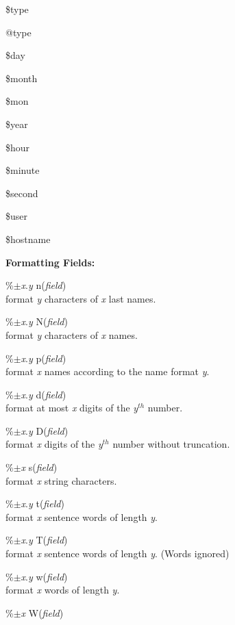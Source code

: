\documentclass[a4paper]{article}
\newenvironment{FlatList}{\begin{list}{}{%
      \topsep=0pt\itemsep=0pt\parsep=0pt\let\makelabel=\flatlistlabel}}{\end{list}}%
\newcommand\flatlistlabel[1]{\descriptionlabel{\textsf{#1}}}
\begin{document}
\begin{multicols}{4}
\begin{FlatList}
  \item [\$type]
  \item [@type]
  \item [\$day]
  \item [\$month]
  \item [\$mon]
  \item [\$year]
  \item [\$hour]
  \item [\$minute]
  \item [\$second]
  \item [\$user]
  \item [\$hostname]
  \end{FlatList}
  \textbf{Formatting Fields:} 
  \begin{FlatList}
  \item [\%$\pm ${\it x}.{\it y}\/ n({\it field}\/)]\ \\
    format {\it y}\/ characters of {\it x}\/ last names.
  \item [\%$\pm ${\it x}.{\it y}\/ N({\it field}\/)]\ \\
    format {\it y}\/ characters of {\it x}\/ names.
  \item [\%$\pm ${\it x}.{\it y}\/ p({\it field}\/)]\ \\
    format {\it x}\/ names according to the name format {\it y}.
  \item [\%$\pm ${\it x}.{\it y}\/ d({\it field}\/)]\ \\
    format at most {\it x}\/ digits of the {\it y}$^{th}$ number.
  \item [\%$\pm ${\it x}.{\it y}\/ D({\it field}\/)]\ \\
    format {\it x}\/ digits of the {\it y}$^{th}$ number without truncation.
  \item [\%$\pm ${\it x}\/ s({\it field}\/)]\ \\
    format {\it x}\/ string characters.
  \item [\%$\pm ${\it x}.{\it y}\/ t({\it field}\/)]\ \\
    format {\it x}\/ sentence words of length {\it y}.
  \item [\%$\pm ${\it x}.{\it y}\/ T({\it field}\/)]\ \\
    format {\it x}\/ sentence words  of length {\it y}. (Words ignored)
  \item [\%$\pm ${\it x}.{\it y}\/ w({\it field}\/)]\ \\
    format {\it x}\/ words of length {\it y}.
  \item [\%$\pm ${\it x}\/ W({\it field}\/)]\ \\

\end{FlatList}
\end{multicols}
\end{document}
